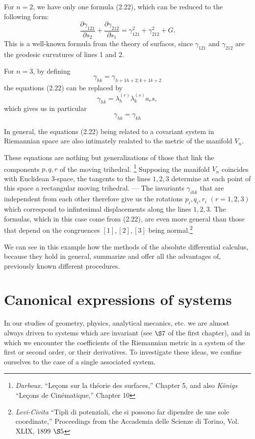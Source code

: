 \documentclass{book}
\begin{document}
For $n=2$, we have only one formula (2.22), which can be reduced to the following form:
\begin{equation*}
\tag{$2.22_1$}
\frac{\partial \gamma_{121}}{\partial s_2}+\frac{\partial \gamma_{212}}{\partial s_1}=\gamma^2_{121}+\gamma^2_{212}+G.
\end{equation*}
This is a well-known formula from the theory of surfaces, since $\gamma_{121}$ and $\gamma_{212}$ are the geodesic curvatures of lines 1 and 2.

For $n=3$, by defining
\begin{equation}
\gamma_{hk}=\gamma_{h+1h+2;k+1k+2}
\end{equation}
the equations (2.22) can be replaced by
\begin{equation*}
\tag{$22_2$}
\gamma_{hk}=\lambda_h^{(r)}\lambda_k^{(s)}a_rs,
\end{equation*}
which gives us in particular
$$\gamma_{hk}=\gamma_{kh}$$

In general, the equations (2.22) being related to a covariant system in Riemannian space are also intimately realated to the metric of the manifold $V_n$. 

These equations are nothing but generalizations of those that link the components $p,q,r$ of the moving trihedral. \footnote{\emph{Darboux.} ``Le\c{c}ons sur la th\'{e}orie des surfaces,'' Chapter 5, and also \emph{K\"{o}nigs} ``Le\c{c}ons de Cin\'{e}matique,'' Chapter 10} Supposing the manifold $V_n$ coincides with Euclidean 3-space, the tangents to the lines $1,2,3$ determine at each point of this space a rectangular moving trihedral. --- The invariants $\gamma_{ihk}$ that are independent from each other therefore give us the rotations $p_i,q_i,r_i$ $(r=1,2,3)$ which correspond to infintesimal displacements along the lines $1,2,3$. The formulas, which in this case come from (2.22), are even more general than those that depend on the congruences $[1],[2],[3]$ being normal.\footnote{\emph{Levi-Civita} ``Tipli di potenziali, che si possono far dipendre de une sole coordinate,'' Proceedings from the Accademia delle Scienze di Torino, Vol. XLIX, 1899 $\S5$}

We can see in this example how the methods of the absolute differential calculus, because they hold in general, summarize and offer all the advantages of, previously known different procedures.
\section{Canonical expressions of systems}
In our studies of geometry, physics, analytical mecanics, etc. we are almost always driven to systems which are invariant (see $\S7$ of the first chapter), and in which we encounter the coefficients of the Riemannian metric in a system of the first or second order, or their derivatives. To investigate these ideas, we confine ourselves to the case of a single associated system. 
\end{document}
